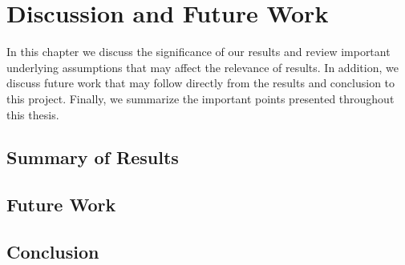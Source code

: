 %
%
%

\chapter{Discussion and Future Work}\label{ch:conclusion}

In this chapter we discuss the significance of our results and review
important underlying assumptions that may affect the relevance of results.
In addition, we discuss future work that may follow directly from the 
results and conclusion to this project.  Finally, we summarize the
important points presented throughout this thesis.

\section{Summary of Results}

\section{Future Work}

\section{Conclusion}
